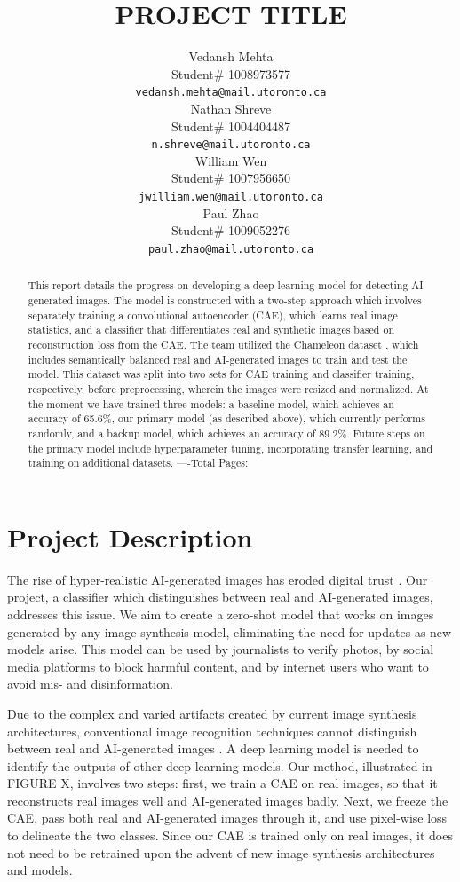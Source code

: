 \documentclass{article} %
\title{PROJECT TITLE}
\author{Vedansh Mehta  \\
Student\# 1008973577 \\
\texttt{vedansh.mehta@mail.utoronto.ca} \\
\And
Nathan Shreve  \\
Student\# 1004404487 \\
\texttt{n.shreve@mail.utoronto.ca} \\
\AND
William Wen  \\
Student\# 1007956650 \\
\texttt{jwilliam.wen@mail.utoronto.ca} \\
\And
Paul Zhao \\
Student\# 1009052276 \\
\texttt{paul.zhao@mail.utoronto.ca} \\
\AND
}
\begin{document}
\maketitle

\begin{abstract}
    This report details the progress on developing a deep learning model for detecting AI-generated images. The model is constructed with a two-step approach which involves separately training a convolutional autoencoder (CAE), which learns real image statistics, and a classifier that differentiates real and synthetic images based on reconstruction loss from the CAE. The team utilized the Chameleon dataset \citep{yan2024sanity}, which includes semantically balanced real and AI-generated images to train and test the model. This dataset was split into two sets for CAE training and classifier training, respectively, before preprocessing, wherein the images were resized and normalized. At the moment we have trained three models: a baseline model, which achieves an accuracy of 65.6\%, our primary model (as described above), which currently performs randomly, and a backup model, which achieves an accuracy of 89.2\%. Future steps on the primary model include hyperparameter tuning, incorporating transfer learning, and training on additional datasets.
    ----Total Pages: \pageref{last_page}
\end{abstract}



\section{Project Description}

The rise of hyper-realistic AI-generated images has eroded digital trust \citep{digitalcontent2024trust}. Our project, a classifier which distinguishes between real and AI-generated images, addresses this issue. We aim to create a zero-shot model that works on images generated by any image synthesis model, eliminating the need for updates as new models arise. This model can be used by journalists to verify photos, by social media platforms to block harmful content, and by internet users who want to avoid mis- and disinformation.


Due to the complex and varied artifacts created by current image synthesis architectures, conventional image recognition techniques cannot distinguish between real and AI-generated images \citep{ledig2017}. A deep learning model is needed to identify the outputs of other deep learning models. Our method, illustrated in FIGURE X, involves two steps: first, we train a CAE on real images, so that it reconstructs real images well and AI-generated images badly. Next, we freeze the CAE, pass both real and AI-generated images through it, and use pixel-wise loss to delineate the two classes. Since our CAE is trained only on real images, it does not need to be retrained upon the advent of new image synthesis architectures and models.
\end{document}
